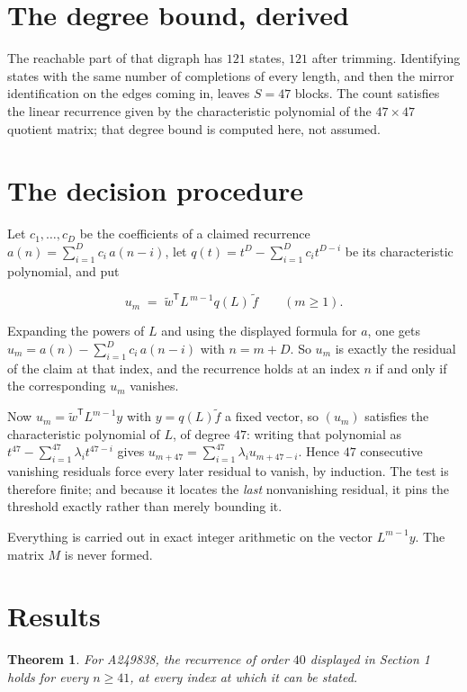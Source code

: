 \documentclass[11pt]{article}
\newtheorem{theorem}{Theorem}
\theoremstyle{definition}
\begin{document}
\section{The degree bound, derived}

The reachable part of that digraph has $121$ states, $121$ after trimming. Identifying states with the same number of completions of every length, and then the mirror identification on the edges coming in, leaves $S = 47$ blocks. The count satisfies the linear recurrence given by the characteristic polynomial of the $47\times47$ quotient matrix; that degree bound is computed here, not assumed.

\section{The decision procedure}

Let $c_1,\dots,c_D$ be the coefficients of a claimed recurrence $a(n) = \sum_{i=1}^{D} c_i\,a(n-i)$, let $q(t) = t^{D} - \sum_{i=1}^{D} c_i t^{D-i}$ be its characteristic polynomial, and put

\[u_m \;=\; \tilde w^{\mathsf T} L^{\,m-1} q(L)\,\tilde f \qquad (m \ge 1).\]

Expanding the powers of $L$ and using the displayed formula for $a$, one gets $u_m = a(n) - \sum_{i=1}^{D} c_i\,a(n-i)$ with $n = m + D$. So $u_m$ is exactly the residual of the claim at that index, and the recurrence holds at an index $n$ if and only if the corresponding $u_m$ vanishes.

Now $u_m = \tilde w^{\mathsf T} L^{m-1} y$ with $y = q(L)\tilde f$ a fixed vector, so $(u_m)$ satisfies the characteristic polynomial of $L$, of degree $47$: writing that polynomial as $t^{47} - \sum_{i=1}^{47} \lambda_i t^{47-i}$ gives $u_{m+47} = \sum_{i=1}^{47} \lambda_i u_{m+47-i}$. Hence $47$ consecutive vanishing residuals force every later residual to vanish, by induction. The test is therefore finite; and because it locates the {\itshape last} nonvanishing residual, it pins the threshold exactly rather than merely bounding it.

Everything is carried out in exact integer arithmetic on the vector $L^{m-1}y$. The matrix $M$ is never formed.

\section{Results}

\begin{theorem} For A249838, the recurrence of order $40$ displayed in Section 1 holds for every $n \ge 41$, at every index at which it can be stated.\end{theorem}
\end{document}
